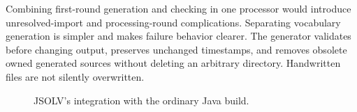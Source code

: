\documentclass[11pt]{article}
\begin{document}
Combining first-round generation and checking in one processor would introduce
unresolved-import and processing-round complications. Separating vocabulary
generation is simpler and makes failure behavior clearer. The generator
validates before changing output, preserves unchanged timestamps, and removes
obsolete owned generated sources without deleting an arbitrary directory.
Handwritten files are not silently overwritten.

\begin{figure}[ht]
\centering
{}
\caption{JSOLV's integration with the ordinary Java build.}
\end{figure}
\end{document}
